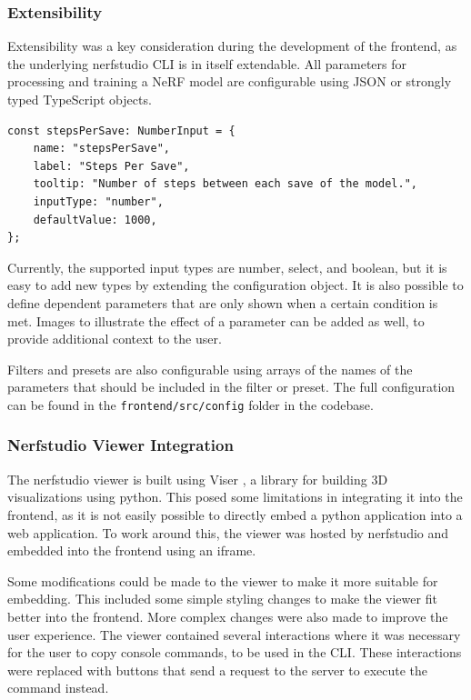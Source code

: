 \subsubsection{Extensibility}

Extensibility was a key consideration during the development of the frontend, as the underlying nerfstudio CLI is in itself extendable.
All parameters for processing and training a NeRF model are configurable using JSON or strongly typed TypeScript objects.

\begin{lstlisting}[style=ES6, caption=Parameter Option configuration]
const stepsPerSave: NumberInput = {
	name: "stepsPerSave",
	label: "Steps Per Save",
	tooltip: "Number of steps between each save of the model.",
	inputType: "number",
	defaultValue: 1000,
};
\end{lstlisting}

Currently, the supported input types are number, select, and boolean, but it is easy to add new types by extending the configuration object.
It is also possible to define dependent parameters that are only shown when a certain condition is met.
Images to illustrate the effect of a parameter can be added as well, to provide additional context to the user.

Filters and presets are also configurable using arrays of the names of the parameters that should be included in the filter or preset.
The full configuration can be found in the \texttt{frontend/src/config} folder in the codebase.

\subsubsection{Nerfstudio Viewer Integration}

The nerfstudio viewer is built using Viser \cite{noauthor_nerfstudio-projectviser_2024}, a library for building 3D visualizations using python.
This posed some limitations in integrating it into the frontend, as it is not easily possible to directly embed a python application into a web application.
To work around this, the viewer was hosted by nerfstudio and embedded into the frontend using an iframe.

Some modifications could be made to the viewer to make it more suitable for embedding.
This included some simple styling changes to make the viewer fit better into the frontend.
More complex changes were also made to improve the user experience.
The viewer contained several interactions where it was necessary for the user to copy console commands, to be used in the CLI.
These interactions were replaced with buttons that send a request to the server to execute the command instead.

